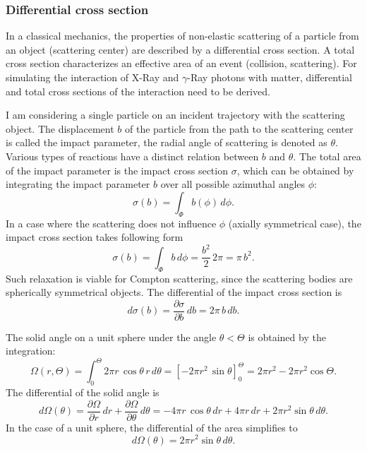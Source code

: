 \documentclass[a4paper,11pt,titlepage,twoside]{article}
\begin{document}

\subsubsection*{Differential cross section}


In a classical mechanics, the properties of non-elastic scattering of a particle from an object (scattering center) are described by a differential cross section.
A total cross section characterizes an effective area of an event (collision, scattering).
For simulating the interaction of X-Ray and $\gamma$-Ray photons with matter, differential and total cross sections of the interaction need to be derived.

I am considering a single particle on an incident trajectory with the scattering object.
The displacement $b$ of the particle from the path to the scattering center is called the impact parameter, the radial angle of scattering is denoted as $\theta$.
Various types of reactions have a distinct relation between $b$ and $\theta$.
The total area of the impact parameter is the impact cross section $\sigma$, which can be obtained by integrating the impact parameter $b$ over all possible azimuthal angles $\phi$:
\begin{equation}
  \sigma\left(b\right) = \int_\Phi b\left(\phi\right)\,d\phi.
\end{equation}
In a case where the scattering does not influence $\phi$ (axially symmetrical case), the impact cross section takes following form
\begin{equation}
  \sigma\left(b\right) = \int_\Phi b\,d\phi = \frac{b^{2}}{2}\,2\pi = \pi\,b^2.
\end{equation}
Such relaxation is viable for Compton scattering, since the scattering bodies are spherically symmetrical objects.
The differential of the impact cross section is
\begin{equation}
  d\sigma\left(b\right) = \frac{\partial \sigma}{\partial b}\,db = 2\pi\,b\,db.
\end{equation}

The solid angle on a unit sphere under the angle $\theta < \Theta$ is obtained by the integration:
\begin{equation}
  \Omega\left(r, \Theta\right) = \int_0^\Theta 2\pi r\,\cos\theta\,r\,d\theta = \left[-2\pi r^2\,\sin\theta\right]_0^\Theta = 2\pi r^2 - 2\pi r^2\cos\Theta.
\end{equation}
The differential of the solid angle is
\begin{equation}
  d\Omega\left(\theta\right) = \frac{\partial \Omega}{\partial r}\,dr + \frac{\partial \Omega}{\partial \theta}\,d\theta = -4\pi r\,\cos\theta\,dr + 4\pi r\,dr + 2\pi r^2\sin\theta\,d\theta.
\end{equation}
In the case of a unit sphere, the differential of the area simplifies to
\begin{equation}
  d\Omega(\theta) = 2\pi r^2\sin\theta\,d\theta.
\end{equation}
\end{document}
